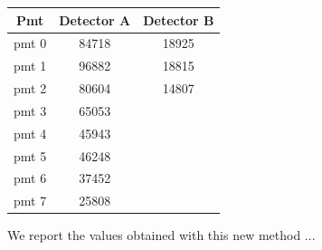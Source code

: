 {\begin{center}
\begin{tabular}{|c|c|c|}
\hline 
Pmt & Detector A & Detector B \\ 
\hline 
pmt 0 & 84718 & 18925 \\ 
\hline 
pmt 1 & 96882 & 18815 \\ 
\hline 
pmt 2 & 80604 & 14807 \\ 
\hline 
pmt 3 & 65053 & \\ 
\hline 
pmt 4 & 45943 & \\ 
\hline 
pmt 5 & 46248 & \\ 
\hline 
pmt 6 & 37452 & \\ 
\hline 
pmt 7 & 25808 & \\ 
\hline 
\end{tabular} 
\end{center}
 
We report the values obtained with this new method ... 

\begin{figure}[hbtp]
\centering
{}
\end{figure}

}
